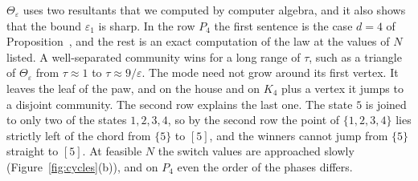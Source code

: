 \begin{remark}
$\Theta_\varepsilon$ uses two resultants that we computed by computer algebra,
and it also shows that the bound $\varepsilon_1$ is sharp. In the row $P_4$ the
first sentence is the case $d=4$ of Proposition~, and the rest
is an exact computation of the law at the values of $N$ listed. A
well-separated community wins for a
long range of $\tau$, such as a triangle of $\Theta_\varepsilon$ from
$\tau\approx1$ to $\tau\approx9/\varepsilon$. The mode need not grow around its
first vertex. It leaves the leaf of the paw, and on the house and on $K_4$ plus
a vertex it jumps to a disjoint community. The second row explains the last
one. The state $5$ is joined to only two of the states $1,2,3,4$, so by the
second row the point of
$\{1,2,3,4\}$ lies strictly left of the chord from $\{5\}$ to $[5]$, and the
winners cannot jump from $\{5\}$ straight to $[5]$. At
feasible $N$ the switch values are approached slowly
(Figure~\ref{fig:cycles}(b)), and on $P_4$ even the order of the phases
differs.
\end{remark}
